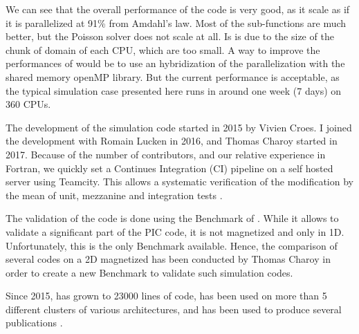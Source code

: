 We can see that the overall performance of the code is very good, as it scale as if it is parallelized at 91\% from Amdahl's law.
Most of the sub-functions are much better, but the Poisson solver does not scale at all.
Is is due to the size of the chunk of domain of each CPU, which are too small.
A way to improve the performances of \LPPic would be to use an hybridization of the parallelization with the shared memory openMP library.
But the current performance is acceptable, as the typical simulation case presented here runs in around one week (7 days) on 360 CPUs.

\vspace{1em}

The development of the  simulation code \LPPic started in 2015 by Vivien Croes.
I joined the development with Romain Lucken in 2016, and Thomas Charoy started in 2017.
Because of the number of contributors, and our relative experience in Fortran, we quickly set a Continues Integration (CI) pipeline on a self hosted server using Teamcity.
This allows a systematic verification of the modification by the mean of unit, mezzanine and integration tests \citep{turner2016}.

The validation of the code is done using the Benchmark of \citet{turner2013}.
While it allows to validate a significant part of the \ac{PIC} code, it is not magnetized and only in \ac{1D}.
Unfortunately, this is the only Benchmark available.
Hence, the comparison of several codes on a \ac{2D} magnetized  has been conducted by Thomas Charoy in order to create a new Benchmark to validate such simulation codes.


Since 2015, \LPPic has grown to 23000 lines of code, has been used on more than 5 different clusters of various architectures, and has been used to produce several publications \citep{croes2017a,croes2018,tavant2018,tavant2019,lucken2018,lucken2019}.
